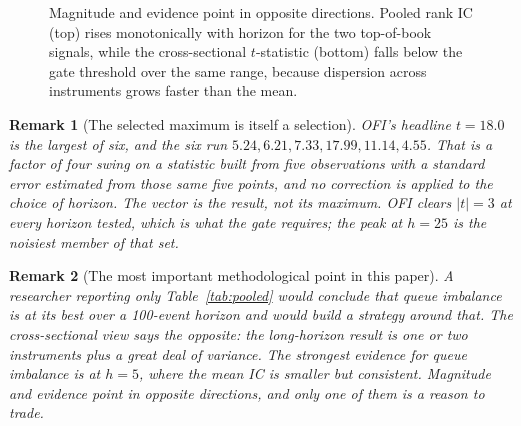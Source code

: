 \documentclass[11pt]{scrartcl}
\newtheorem{remark}{Remark}[section]
\begin{document}
\begin{figure}[H]
\caption{Magnitude and evidence point in opposite directions. Pooled rank IC (top) rises monotonically with horizon for the two top-of-book signals, while the cross-sectional $t$-statistic (bottom) falls below the gate threshold over the same range, because dispersion across instruments grows faster than the mean.}
\label{fig:decay}
\end{figure}

\begin{remark}[The selected maximum is itself a selection]
\label{rem:tmax}
OFI's headline $t = 18.0$ is the largest of six, and the six run $5.24, 6.21, 7.33, 17.99, 11.14, 4.55$. That is a factor of four swing on a statistic built from five observations with a standard error estimated from those same five points, and no correction is applied to the choice of horizon. The vector is the result, not its maximum. OFI clears $|t| = 3$ at every horizon tested, which is what the gate requires; the peak at $h=25$ is the noisiest member of that set.
\end{remark}

\begin{remark}[The most important methodological point in this paper]
\label{rem:pooling}
A researcher reporting only Table~\ref{tab:pooled} would conclude that queue imbalance is at its best over a 100-event horizon and would build a strategy around that. The cross-sectional view says the opposite: the long-horizon result is one or two instruments plus a great deal of variance. The strongest \emph{evidence} for queue imbalance is at $h=5$, where the mean IC is smaller but consistent. Magnitude and evidence point in opposite directions, and only one of them is a reason to trade.
\end{remark}
\end{document}
